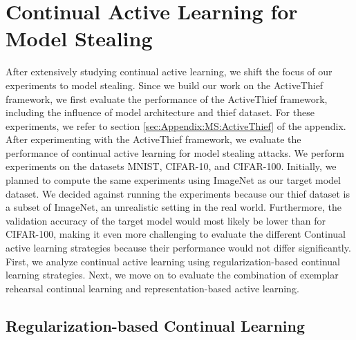 \section{Continual Active Learning for Model Stealing}
\label{sec:Evaluation:MS}
After extensively studying continual active learning, we shift the focus of our experiments to model stealing. Since we build our work on the ActiveThief framework,
we first evaluate the performance of the ActiveThief framework, including the influence of model architecture and thief dataset. For these experiments, we refer to
section \ref{sec:Appendix:MS:ActiveThief} of the appendix. After experimenting with the ActiveThief framework, we evaluate the performance of continual active learning
for model stealing attacks. We perform experiments on the datasets MNIST, CIFAR-10, and CIFAR-100. Initially, we planned to compute the same experiments using ImageNet
as our target model dataset. We decided against running the experiments because our thief dataset is a subset of ImageNet, an unrealistic setting in 
the real world. Furthermore, the validation accuracy of the target model would most likely be lower than for CIFAR-100, making it even more challenging to
evaluate the different Continual active learning strategies because their performance would not differ significantly. First, we analyze continual active
learning using regularization-based continual learning strategies. Next, we move on to evaluate the combination of exemplar rehearsal continual learning and
representation-based active learning. \par


\subsection{Regularization-based Continual Learning}
\label{sec:Evaluation:MS:Regularization}

